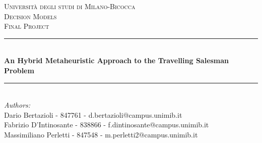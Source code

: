 \documentclass[10pt]{article}
\begin{document}
\begin{titlepage}

\newcommand{\HRule}{\rule{\linewidth}{0.5mm}} %

\center %
 

\textsc{\LARGE Università degli studi di Milano-Bicocca}\\[1cm] %
\textsc{\Large Decision Models}\\[0.3cm] %
\textsc{\large Final Project}\\[0.1cm] %

\HRule \\[0.4cm]
{ \huge \bfseries An Hybrid Metaheuristic Approach to the Travelling Salesman Problem }\\[0.4cm] %
\HRule \\[1.5cm]
 

\large
\emph{Authors:}\\
Dario Bertazioli - 847761 - d.bertazioli@campus.unimib.it \\   %
Fabrizio D'Intinosante - 838866 - f.dintinosante@campus.unimib.it \\
Massimiliano Perletti - 847548 - m.perletti2@campus.unimib.it\\[1cm] %


\end{titlepage}
\end{document}
